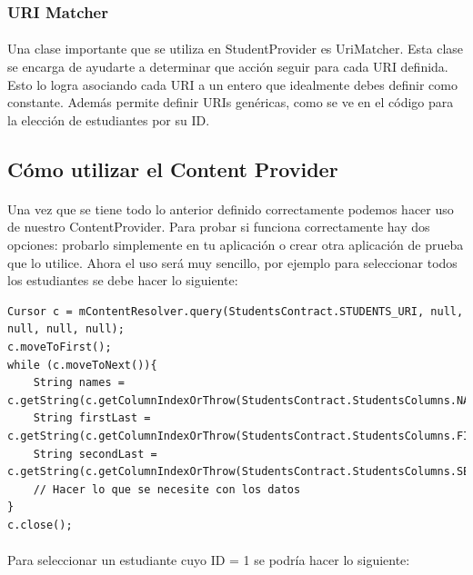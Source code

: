 \documentclass[10pt]{extarticle}
\begin{document}
\subsubsection{URI Matcher}

\paragraph{}
Una clase importante que se utiliza en StudentProvider es UriMatcher. Esta clase se encarga de ayudarte a determinar que acción seguir para cada URI definida. Esto lo logra asociando cada URI a un entero que idealmente debes definir como constante. Además permite definir URIs genéricas, como se ve en el código para la elección de estudiantes por su ID.


\subsection{Cómo utilizar el Content Provider}

\paragraph{}
Una vez que se tiene todo lo anterior definido correctamente podemos hacer uso de nuestro ContentProvider. Para probar si funciona correctamente hay dos opciones: probarlo simplemente en tu aplicación o crear otra aplicación de prueba que lo utilice. Ahora el uso será muy sencillo, por ejemplo para seleccionar todos los estudiantes se debe hacer lo siguiente:

\begin{lstlisting}
Cursor c = mContentResolver.query(StudentsContract.STUDENTS_URI, null, null, null, null);
c.moveToFirst();
while (c.moveToNext()){
	String names = c.getString(c.getColumnIndexOrThrow(StudentsContract.StudentsColumns.NAMES));
    String firstLast = c.getString(c.getColumnIndexOrThrow(StudentsContract.StudentsColumns.FIRST_LASTNAME));
    String secondLast = c.getString(c.getColumnIndexOrThrow(StudentsContract.StudentsColumns.SECOND_LASTNAME));
	// Hacer lo que se necesite con los datos
}
c.close();

\end{lstlisting}

\paragraph{}
Para seleccionar un estudiante cuyo ID = 1 se podría hacer lo siguiente:
\end{document}
